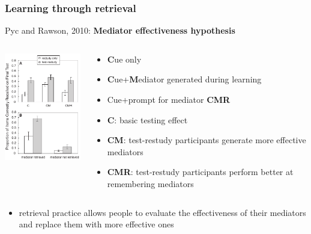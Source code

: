 \documentclass[]{beamer}
\begin{document}
\begin{frame}
 \frametitle{Learning through retrieval}
\begin{overlayarea}{110mm}{80mm}
Pyc and Rawson, 2010: \textbf{Mediator effectiveness hypothesis}
\begin{columns}[T]
\begin{column}{40mm}
 \includegraphics[width=45mm]{figs/l10/pyc_rawson_2010.png}
\end{column}

\begin{column}{70mm}
\begin{itemize}
 \item \textbf{C}ue only
 \item \textbf{C}ue+\textbf{M}ediator generated during learning
 \item Cue+prompt for mediator \textbf{CMR}
 \item<2->[$\rightarrow$] \textbf{C}: basic testing effect
 \item<3->[$\rightarrow$] \textbf{CM}: test-restudy participants generate more effective mediators
 \item<4->[$\rightarrow$] \textbf{CMR}: test-restudy participants perform better at remembering mediators
\end{itemize}
 
\end{column}
\end{columns}

\begin{itemize}
 \item<5->[$\Rightarrow$] retrieval practice allows people to evaluate the effectiveness of their mediators and replace them with more effective ones
\end{itemize}
\end{overlayarea}
\end{frame}
\end{document}
